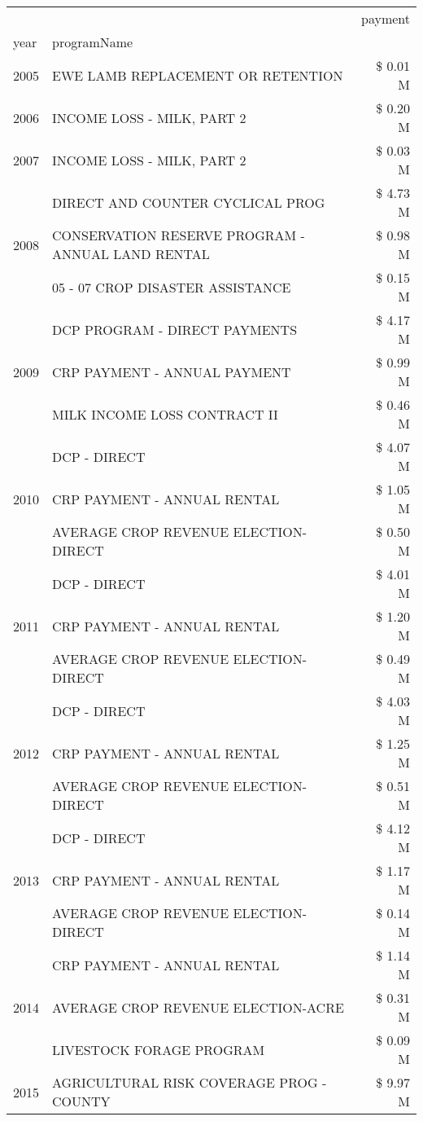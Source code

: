 \begin{tabular}{llr}
\toprule
 &  & payment \\
year & programName &  \\
\midrule
2005 & EWE LAMB REPLACEMENT OR RETENTION & \$ 0.01 M \\
\cline{1-3}
2006 & INCOME LOSS - MILK, PART 2 & \$ 0.20 M \\
\cline{1-3}
2007 & INCOME LOSS - MILK, PART 2 & \$ 0.03 M \\
\cline{1-3}
\multirow[t]{3}{*}{2008} & DIRECT AND COUNTER CYCLICAL PROG & \$ 4.73 M \\
 & CONSERVATION RESERVE PROGRAM - ANNUAL LAND RENTAL & \$ 0.98 M \\
 & 05 - 07 CROP DISASTER ASSISTANCE & \$ 0.15 M \\
\cline{1-3}
\multirow[t]{3}{*}{2009} & DCP PROGRAM - DIRECT PAYMENTS & \$ 4.17 M \\
 & CRP PAYMENT - ANNUAL PAYMENT & \$ 0.99 M \\
 & MILK INCOME LOSS CONTRACT II & \$ 0.46 M \\
\cline{1-3}
\multirow[t]{3}{*}{2010} & DCP - DIRECT & \$ 4.07 M \\
 & CRP PAYMENT - ANNUAL RENTAL & \$ 1.05 M \\
 & AVERAGE CROP REVENUE ELECTION-DIRECT & \$ 0.50 M \\
\cline{1-3}
\multirow[t]{3}{*}{2011} & DCP - DIRECT & \$ 4.01 M \\
 & CRP PAYMENT - ANNUAL RENTAL & \$ 1.20 M \\
 & AVERAGE CROP REVENUE ELECTION-DIRECT & \$ 0.49 M \\
\cline{1-3}
\multirow[t]{3}{*}{2012} & DCP - DIRECT & \$ 4.03 M \\
 & CRP PAYMENT - ANNUAL RENTAL & \$ 1.25 M \\
 & AVERAGE CROP REVENUE ELECTION-DIRECT & \$ 0.51 M \\
\cline{1-3}
\multirow[t]{3}{*}{2013} & DCP - DIRECT & \$ 4.12 M \\
 & CRP PAYMENT - ANNUAL RENTAL & \$ 1.17 M \\
 & AVERAGE CROP REVENUE ELECTION-DIRECT & \$ 0.14 M \\
\cline{1-3}
\multirow[t]{3}{*}{2014} & CRP PAYMENT - ANNUAL RENTAL & \$ 1.14 M \\
 & AVERAGE CROP REVENUE ELECTION-ACRE & \$ 0.31 M \\
 & LIVESTOCK FORAGE PROGRAM & \$ 0.09 M \\
\cline{1-3}
\multirow[t]{3}{*}{2015} & AGRICULTURAL RISK COVERAGE PROG - COUNTY & \$ 9.97 M \\

\end{tabular}
